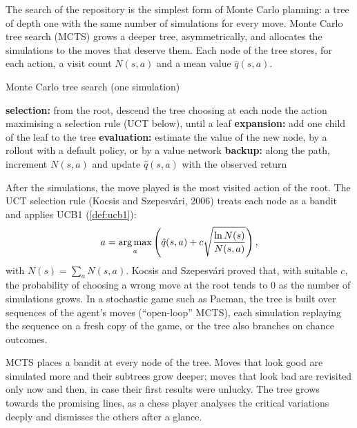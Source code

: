 The search of the repository is the simplest form of Monte Carlo planning:
a tree of depth one with the same number of simulations for every move.
Monte Carlo tree search (MCTS) grows a deeper tree, asymmetrically, and
allocates the simulations to the moves that deserve them. Each node of the
tree stores, for each action, a visit count $N(s, a)$ and a mean value
$\hat q(s, a)$.

\begin{algobox}{Monte Carlo tree search (one simulation)}
  \begin{algorithmic}[1]
    \State \textbf{selection:} from the root, descend the tree choosing at
      each node the action maximising a selection rule (UCT below), until a
      leaf
    \State \textbf{expansion:} add one child of the leaf to the tree
    \State \textbf{evaluation:} estimate the value of the new node, by a
      rollout with a default policy, or by a value network
    \State \textbf{backup:} along the path, increment $N(s, a)$ and update
      $\hat q(s, a)$ with the observed return
  \end{algorithmic}
\end{algobox}

After the simulations, the move played is the most visited action of the
root. The UCT selection rule (Kocsis and Szepesv\'ari, 2006) treats each
node as a bandit and applies UCB1 (\cref{def:ucb1}):
\begin{equation}
  a = \operatorname*{arg\,max}_{a} \left( \hat q(s, a) + c \sqrt{\frac{\ln N(s)}{N(s,
  a)}} \right),
\end{equation}
with $N(s) = \sum_a N(s, a)$. Kocsis and Szepesv\'ari proved that, with
suitable $c$, the probability of choosing a wrong move at the root tends
to $0$ as the number of simulations grows. In a stochastic game such as
Pacman, the tree is built over sequences of the agent's moves
(``open-loop'' MCTS), each simulation replaying the sequence on a fresh
copy of the game, or the tree also branches on chance outcomes.

\begin{intuition}
  MCTS places a bandit at every node of the tree. Moves that look good are
  simulated more and their subtrees grow deeper; moves that look bad are
  revisited only now and then, in case their first results were unlucky.
  The tree grows towards the promising lines, as a chess player analyses
  the critical variations deeply and dismisses the others after a glance.
\end{intuition}

